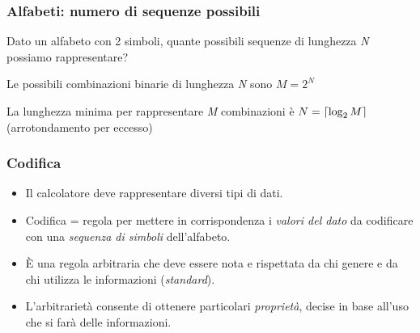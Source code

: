 \documentclass[handout]{beamer}
\DeclarePairedDelimiter{\ceil}{\lceil}{\rceil}
\begin{document}
\begin{frame}
\frametitle{Alfabeti: numero di sequenze possibili}
Dato un alfabeto con 2 simboli, quante possibili sequenze di lunghezza \emph{N} possiamo rappresentare?
\pause

Le possibili combinazioni binarie di lunghezza \emph{N} sono $M = 2^N$

La lunghezza minima per rappresentare \emph{M} combinazioni è $N = \ceil{\log_2M}$ (arrotondamento per eccesso)
\end{frame}

\begin{frame}
\frametitle{Codifica}
\begin{itemize}[<+->]
	\item Il calcolatore deve rappresentare diversi tipi di dati.
	\item Codifica = \alert{regola} per mettere in corrispondenza i \emph{valori del dato} da codificare con una \emph{sequenza di simboli} dell'alfabeto.
	\item È una regola arbitraria che deve essere nota e rispettata da chi genere e da chi utilizza le informazioni (\emph{standard}).
	\item L'arbitrarietà consente di ottenere particolari \emph{proprietà}, decise in base all'uso che si farà delle informazioni.
\end{itemize}
\end{frame}
\end{document}
